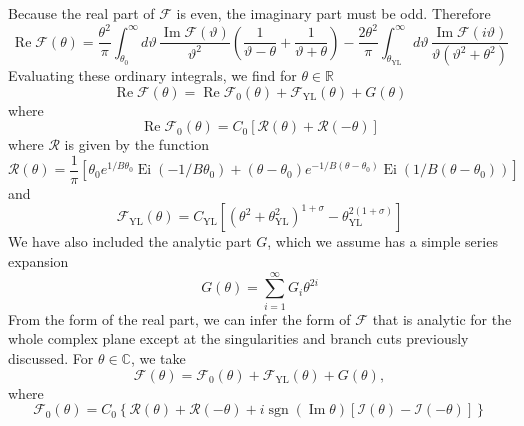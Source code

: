 \documentclass[
aps,
pre,
preprint,
longbibliography,
floatfix
]{revtex4-2}
\begin{document}
Because the real part of $\mathcal F$ is even, the imaginary part must be odd. Therefore
\begin{equation} \label{eq:dispersion}
  \operatorname{Re}\mathcal F(\theta)
  =\frac{\theta^2}{\pi}
  \int_{\theta_0}^\infty d\vartheta\,\frac{\operatorname{Im}\mathcal F(\vartheta)}{\vartheta^2}\left(\frac1{\vartheta-\theta}+\frac1{\vartheta+\theta}\right)
  -\frac{2\theta^2}\pi\int_{\theta_{\mathrm{YL}}}^{\infty}d\vartheta\,\frac{\operatorname{Im}\mathcal F(i\vartheta)}{\vartheta(\vartheta^2+\theta^2)}
\end{equation}
Evaluating these ordinary integrals, we find for $\theta\in\mathbb R$
\begin{equation}
  \operatorname{Re}\mathcal F(\theta)=\operatorname{Re}\mathcal F_0(\theta)+\mathcal F_\mathrm{YL}(\theta)+G(\theta)
\end{equation}
where
\begin{equation} \label{eq:2d.real.Fc}
  \operatorname{Re}\mathcal F_0(\theta)
  =C_0[\mathcal R(\theta)+\mathcal R(-\theta)]
\end{equation}
where $\mathcal R$ is given by the function
\begin{equation}
  \mathcal R(\theta)
  =\frac1\pi\left[
    \theta_0e^{1/B\theta_0}\operatorname{Ei}(-1/B\theta_0)
    +(\theta-\theta_0)e^{-1/B(\theta-\theta_0)}\operatorname{Ei}(1/B(\theta-\theta_0))
  \right]
\end{equation}
and
\begin{equation}
  \mathcal F_{\mathrm{YL}}(\theta)=C_{\mathrm{YL}}\left[(\theta^2+\theta_{\mathrm{YL}}^2)^{1+\sigma}-\theta_{\mathrm{YL}}^{2(1+\sigma)}\right]
\end{equation}
We have also included the analytic part $G$, which we assume has a simple series expansion
\begin{equation}
  G(\theta)=\sum_{i=1}^\infty G_i\theta^{2i}
\end{equation}
From the form of the real part, we can infer the form of $\mathcal F$ that is analytic for the whole complex plane except at the singularities and branch cuts previously discussed.
For $\theta\in\mathbb C$, we take
\begin{equation}
  \mathcal F(\theta)=\mathcal F_0(\theta)+\mathcal F_{\mathrm{YL}}(\theta)+G(\theta),
\end{equation}
where
\begin{equation}
  \mathcal F_0(\theta)=C_0\left\{
    \mathcal R(\theta)+\mathcal R(-\theta)+i\operatorname{sgn}(\operatorname{Im}\theta)[\mathcal I(\theta)-\mathcal I(-\theta)]
  \right\}
\end{equation}
\end{document}

